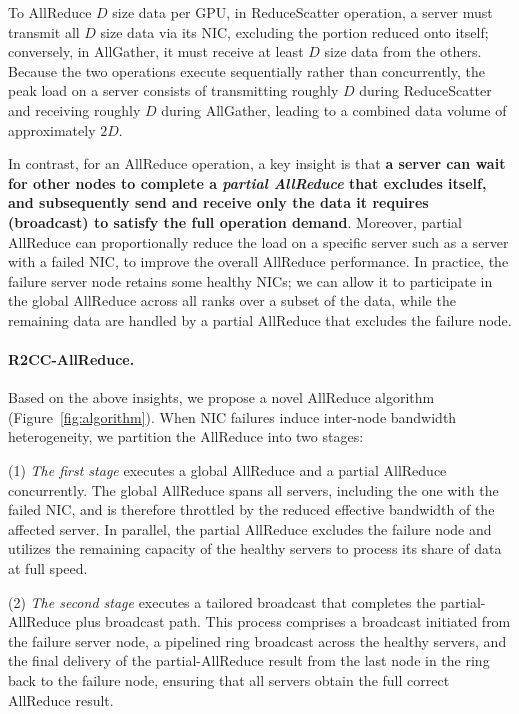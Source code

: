 To AllReduce $D$ size data per GPU, in ReduceScatter operation, a server must transmit all $D$ size data via its NIC, excluding the portion reduced onto itself; conversely, in AllGather, it must receive at least $D$ size data from the others. Because the two operations execute sequentially rather than concurrently, the peak load on a server consists of transmitting roughly $D$ during ReduceScatter and receiving roughly $D$ during AllGather, leading to a combined data volume of approximately $2D$.

In contrast, for an AllReduce operation, a key insight is that {\bf a server can wait for other nodes to complete a \textit{partial AllReduce} that excludes itself, and subsequently send and receive only the data it requires (broadcast) to satisfy the full operation demand}. Moreover, partial AllReduce can proportionally reduce the load on a specific server such as a server with a failed NIC, to improve the overall AllReduce performance. In practice, the failure server node retains some healthy NICs; we can allow it to participate in the global AllReduce across all ranks over a
subset of the data, while the remaining data are handled by a
partial AllReduce that excludes the failure node.

\paragraph{R2CC-AllReduce.} Based on the above insights, we propose a novel AllReduce algorithm (Figure~\ref{fig:algorithm}). When NIC failures induce inter-node bandwidth heterogeneity, we partition the AllReduce into two stages:

(1) \textit{The first stage} executes a global AllReduce and a partial AllReduce concurrently. The global AllReduce spans all servers, including the one with the failed NIC, and is therefore throttled by the reduced effective bandwidth of the affected server. In parallel, the partial AllReduce excludes the failure node and utilizes the remaining capacity of the healthy servers to process its share of data at full speed.

(2) \textit{The second stage} executes a tailored broadcast that completes the partial-AllReduce plus broadcast path. This process comprises a broadcast initiated from the failure server node, a pipelined ring broadcast across the healthy servers, and the final delivery of the partial-AllReduce result from the last node in the ring back to the failure node, ensuring that all servers obtain the full correct AllReduce result.

